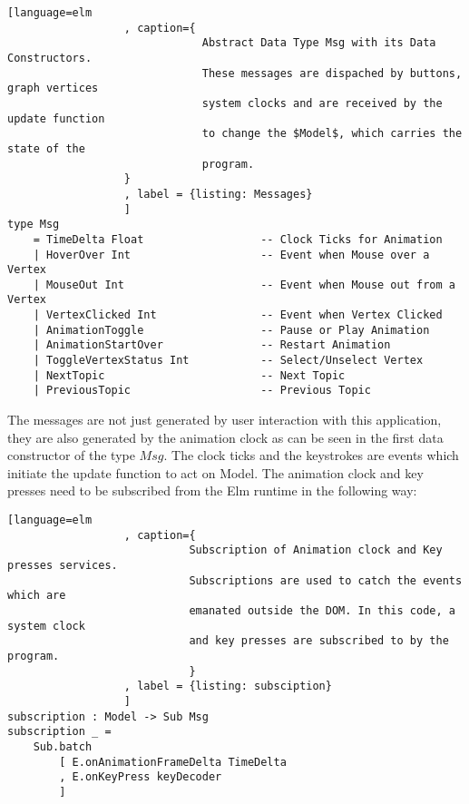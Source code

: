 \begin{lstlisting}[language=elm
                  , caption={
                              Abstract Data Type Msg with its Data Constructors.
                              These messages are dispached by buttons, graph vertices
                              system clocks and are received by the update function
                              to change the $Model$, which carries the state of the
                              program.
                  }
                  , label = {listing: Messages}
                  ]
type Msg
    = TimeDelta Float                  -- Clock Ticks for Animation
    | HoverOver Int                    -- Event when Mouse over a Vertex                              
    | MouseOut Int                     -- Event when Mouse out from a Vertex                               
    | VertexClicked Int                -- Event when Vertex Clicked                              
    | AnimationToggle                  -- Pause or Play Animation
    | AnimationStartOver               -- Restart Animation
    | ToggleVertexStatus Int           -- Select/Unselect Vertex
    | NextTopic                        -- Next Topic
    | PreviousTopic                    -- Previous Topic

\end{lstlisting}

The messages are not just generated by user interaction with this application,
they are also generated by the animation clock as can be seen in
the first data constructor of the type $Msg$.  The clock ticks and the keystrokes are events which initiate the update function to act on Model.  The
animation clock and key presses need to be subscribed from the Elm runtime in
the following way:

\begin{lstlisting}[language=elm
                  , caption={
                            Subscription of Animation clock and Key presses services.
                            Subscriptions are used to catch the events which are
                            emanated outside the DOM. In this code, a system clock
                            and key presses are subscribed to by the program.
                            }
                  , label = {listing: subsciption}
                  ]
subscription : Model -> Sub Msg
subscription _ =
    Sub.batch
        [ E.onAnimationFrameDelta TimeDelta
        , E.onKeyPress keyDecoder
        ]
\end{lstlisting}

